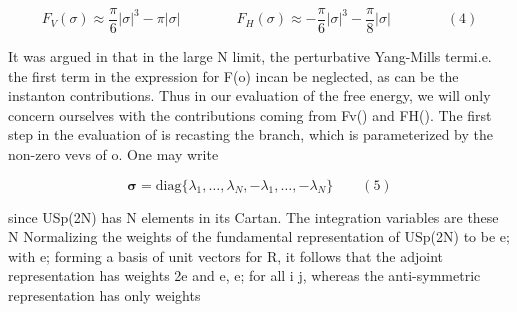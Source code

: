 \documentclass{article}
\begin{document}
\begin{equation}
F _ { V } ( \sigma ) \approx \frac { \pi } { 6 } | \sigma | ^ { 3 } - \pi | \sigma | \qquad \qquad F _ { H } ( \sigma ) \approx - \frac { \pi } { 6 } | \sigma | ^ { 3 } - \frac { \pi } { 8 } | \sigma | \qquad \qquad ( 4 )
\end{equation}


It was argued in that in the large N limit, the perturbative Yang-Mills termi.e. the first
term in the expression for F(o) incan be neglected, as can be the instanton contributions.
Thus in our evaluation of the free energy, we will only concern ourselves with the contributions coming from Fv() and FH(). The first step in the evaluation of is recasting the
branch, which is parameterized by the non-zero vevs of o. One may write


\begin{equation}
{ \boldsymbol \sigma } = \mathrm { d i a g } \{ \lambda _ { 1 }, \dots, \lambda _ { N }, - \lambda _ { 1 }, \dots, - \lambda _ { N } \} \qquad ( 5 )
\end{equation}


since USp(2N) has N elements in its Cartan. The integration variables are these N 
Normalizing the weights of the fundamental representation of USp(2N) to be e; with e;
forming a basis of unit vectors for R, it follows that the adjoint representation has weights
2e and e,  e; for all i  j, whereas the anti-symmetric representation has only weights
\end{document}
